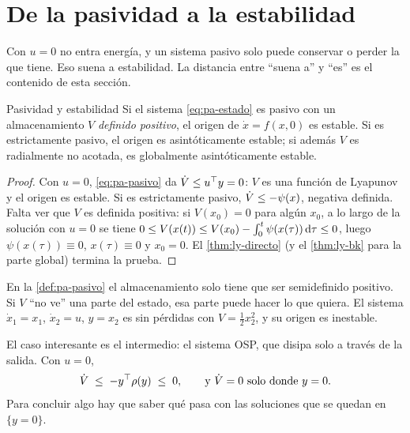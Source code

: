 \section{De la pasividad a la estabilidad}
\label{sec:pa-estabilidad}

Con $u=0$ no entra energía, y un sistema pasivo solo puede conservar o perder la que tiene. Eso suena a estabilidad. La distancia entre ``suena a'' y ``es'' es el contenido de esta sección.

\begin{lema}[label=lem:pa-estable]{Pasividad y estabilidad \citep[Lema~6.6]{Kha02}}
Si el sistema \eqref{eq:pa-estado} es pasivo con un almacenamiento $V$ \emph{definido positivo}, el origen de $\dot x=f(x,0)$ es estable. Si es estrictamente pasivo, el origen es asintóticamente estable; si además $V$ es radialmente no acotada, es globalmente asintóticamente estable.
\end{lema}

\begin{proof}
Con $u=0$, \eqref{eq:pa-pasivo} da $\dot V\le u^{\top} y=0$: $V$ es una función de Lyapunov y el origen es estable. Si es estrictamente pasivo, $\dot V\le-\psi(x)$, negativa definida. Falta ver que $V$ es definida positiva: si $V(x_0)=0$ para algún $x_0$, a lo largo de la solución con $u=0$ se tiene $0\le V(x(t))\le V(x_0)-\int_0^t\psi(x(\tau))\,\mathrm{d}\tau\le0$, luego $\psi(x(\tau))\equiv0$, $x(\tau)\equiv0$ y $x_0=0$. El \cref{thm:ly-directo} (y el \cref{thm:ly-bk} para la parte global) termina la prueba.
\end{proof}

\begin{cuidado}
En la \cref{def:pa-pasivo} el almacenamiento solo tiene que ser semidefinido positivo. Si $V$ ``no ve'' una parte del estado, esa parte puede hacer lo que quiera. El sistema $\dot x_1=x_1$, $\dot x_2=u$, $y=x_2$ es sin pérdidas con $V=\tfrac12x_2^2$, y su origen es inestable.
\end{cuidado}

El caso interesante es el intermedio: el sistema OSP, que disipa solo a través de la salida. Con $u=0$,
\begin{equation}
  \dot V\;\le\;-y^{\top}\rho(y)\;\le\;0,\qquad\text{y }\dot V=0\text{ solo donde }y=0 .
  \label{eq:pa-ospu0}
\end{equation}
Para concluir algo hay que saber qué pasa con las soluciones que se quedan en $\{y=0\}$.


